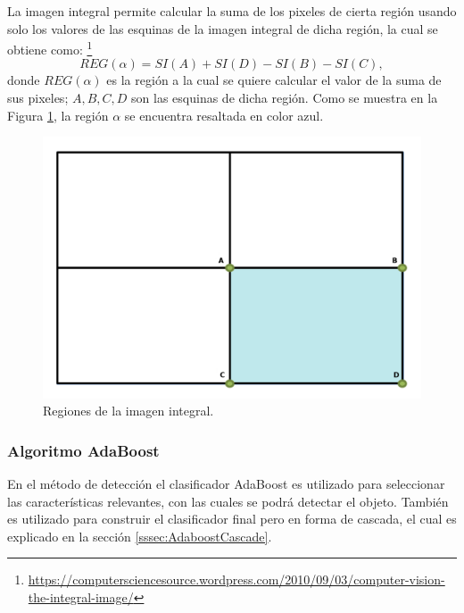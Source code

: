 La imagen integral permite calcular la suma de los pixeles de cierta región usando solo los valores de las esquinas de la imagen integral de dicha región, la cual se obtiene como: \footnote{\url{https://computersciencesource.wordpress.com/2010/09/03/computer-vision-the-integral-image/}}    
\begin{equation}
REG(\alpha)=SI(A)+SI(D)-SI(B)-SI(C),
\end{equation}
donde $REG(\alpha)$ es la región a la cual se quiere calcular el valor de la suma de sus pixeles; $A,B,C,D$ son las esquinas de dicha región. Como se muestra en la Figura \ref{fig:figImageIntegral}, la región $\alpha$ se encuentra resaltada en color azul.  
\begin{figure}[h!]
\begin{center}
\includegraphics[scale=.25]{./Figures/IntegralImage.png}
\end{center}
\caption{Regiones de la imagen integral.}
\label{fig:figImageIntegral}
\end{figure} 


\subsubsection{Algoritmo AdaBoost}\label{sssec:AdaboostClasifier}  

En el método de detección el clasificador AdaBoost es utilizado para seleccionar las características relevantes, con las cuales se podrá detectar el objeto. También es utilizado para construir el clasificador final pero en forma de cascada, el cual es explicado en la sección \ref{sssec:AdaboostCascade}. 

